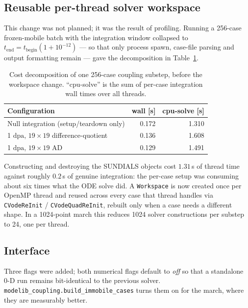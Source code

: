 \documentclass[11pt,a4paper]{article}
\newcommand{\code}[1]{\texttt{\small #1}}
\newcommand{\dpa}{\ensuremath{\mathrm{dpa}}}
\begin{document}
\subsection{Reusable per-thread solver workspace}
\label{sec:workspace}

This change was not planned; it was the result of profiling. Running a 256-case
frozen-mobile batch with the integration window collapsed to
$t_{\mathrm{end}}=t_{\mathrm{begin}}(1+10^{-12})$ --- so that only process
spawn, case-file parsing and output formatting remain --- gave the decomposition
in Table~\ref{tab:overhead}.

\begin{table}[htb]
\centering
\caption{Cost decomposition of one 256-case coupling substep, before the
workspace change. ``cpu-solve'' is the sum of per-case integration wall times
over all threads.}
\label{tab:overhead}
\begin{tabular}{lrr}
\toprule
Configuration & wall [s] & cpu-solve [s] \\
\midrule
Null integration (setup/teardown only) & 0.172 & 1.310 \\
1 \dpa, $19\times19$ difference-quotient & 0.136 & 1.608 \\
1 \dpa, $19\times19$ AD                  & 0.129 & 1.491 \\
\bottomrule
\end{tabular}
\end{table}

Constructing and destroying the SUNDIALS objects cost $1.31\,$s of thread time
against roughly $0.2\,$s of genuine integration: the per-case setup was
consuming about six times what the ODE solve did. A \code{Workspace} is now
created once per OpenMP thread and reused across every case that thread handles
via \code{CVodeReInit} / \code{CVodeQuadReInit}, rebuilt only when a case needs
a different shape. In a 1024-point march this reduces 1024 solver
constructions per substep to 24, one per thread.

\subsection{Interface}

Three flags were added; both numerical flags default to \emph{off} so that a
standalone 0-D run remains bit-identical to the previous solver.
\code{modelib\_coupling.build\_immobile\_cases} turns them on for the march,
where they are measurably better.
\end{document}
